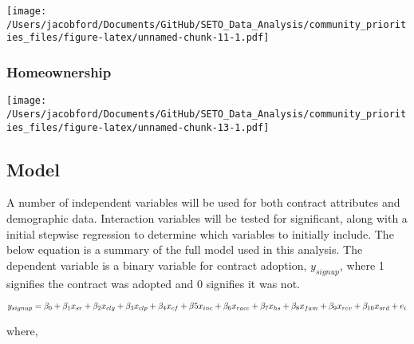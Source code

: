 \documentclass[
]{article}
\begin{document}
\texttt{[image: /Users/jacobford/Documents/GitHub/SETO\_Data\_Analysis/community\_priorities\_files/figure-latex/unnamed-chunk-11-1.pdf]}

\hypertarget{homeownership}{%
\subsubsection{Homeownership}\label{homeownership}}

\texttt{[image: /Users/jacobford/Documents/GitHub/SETO\_Data\_Analysis/community\_priorities\_files/figure-latex/unnamed-chunk-13-1.pdf]}

\hypertarget{model}{%
\subsection{Model}\label{model}}

A number of independent variables will be used for both contract
attributes and demographic data. Interaction variables will be tested
for significant, along with a initial stepwise regression to determine
which variables to initially include. The below equation is a summary of
the full model used in this analysis. The dependent variable is a binary
variable for contract adoption, \(y_{signup}\), where 1 signifies the
contract was adopted and 0 signifies it was not.

\begin{equation}

y_{signup} = \beta_{0} + \beta_{1}x_{sr} +\beta_{2}x_{cly} +\beta_{3}x_{clp}  +\beta_{4}x_{cf} + \\  \beta{5}x_{inc}+\beta_{6}x_{race} + \beta_{7}x_{hs} +\beta_{8}x_{fam} + \beta_{9}x_{rev} + \beta_{10}x_{ord}+ e_{i}

\end{equation}

where,
\end{document}
